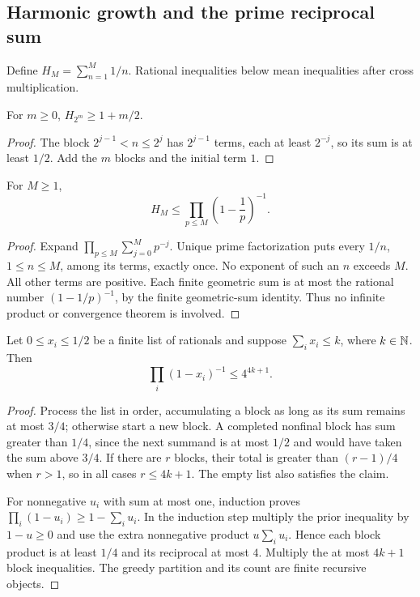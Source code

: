 \subsection{Harmonic growth and the prime reciprocal sum}
Define $H_M=\sum_{n=1}^M1/n$. Rational inequalities below mean inequalities after cross multiplication.

\begin{lemma}\label{an:harmonic}
For $m\ge0$, $H_{2^m}\ge1+m/2$.
\end{lemma}
\begin{proof}
The block $2^{j-1}<n\le2^j$ has $2^{j-1}$ terms, each at least $2^{-j}$, so its sum is at least $1/2$. Add the $m$ blocks and the initial term $1$.
\end{proof}

\begin{lemma}\label{an:eulerdom}
For $M\ge1$,
\[
 H_M\le\prod_{p\le M}\left(1-\frac1p\right)^{-1}.
\]
\end{lemma}
\begin{proof}
Expand $\prod_{p\le M}\sum_{j=0}^{M}p^{-j}$. Unique prime factorization puts every $1/n$, $1\le n\le M$, among its terms, exactly once. No exponent of such an $n$ exceeds $M$. All other terms are positive. Each finite geometric sum is at most the rational number $(1-1/p)^{-1}$, by the finite geometric-sum identity. Thus no infinite product or convergence theorem is involved.
\end{proof}

\begin{lemma}\label{an:blockproduct}
Let $0\le x_i\le1/2$ be a finite list of rationals and suppose $\sum_i x_i\le k$, where $k\in\mathbb N$. Then
\[
 \prod_i(1-x_i)^{-1}\le4^{4k+1}.
\]
\end{lemma}
\begin{proof}
Process the list in order, accumulating a block as long as its sum remains at most $3/4$; otherwise start a new block. A completed nonfinal block has sum greater than $1/4$, since the next summand is at most $1/2$ and would have taken the sum above $3/4$. If there are $r$ blocks, their total is greater than $(r-1)/4$ when $r>1$, so in all cases $r\le4k+1$. The empty list also satisfies the claim.

For nonnegative $u_i$ with sum at most one, induction proves $\prod_i(1-u_i)\ge1-\sum_i u_i$. In the induction step multiply the prior inequality by $1-u\ge0$ and use the extra nonnegative product $u\sum_i u_i$. Hence each block product is at least $1/4$ and its reciprocal at most $4$. Multiply the at most $4k+1$ block inequalities. The greedy partition and its count are finite recursive objects.
\end{proof}


